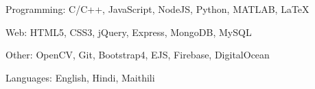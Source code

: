 



    
    
\begin{cvskills}

  \cvskill
    {Programming:} %
    {C/C++, JavaScript, NodeJS, Python, MATLAB, LaTeX} %

  \cvskill
    {Web:} %
    {HTML5, CSS3, jQuery, Express, MongoDB, MySQL} %

\cvskill
    {Other:} %
    { OpenCV, Git, Bootstrap4, EJS, Firebase, DigitalOcean} %

  \cvskill
    {Languages:} %
    {English, Hindi, Maithili} %

\end{cvskills}

